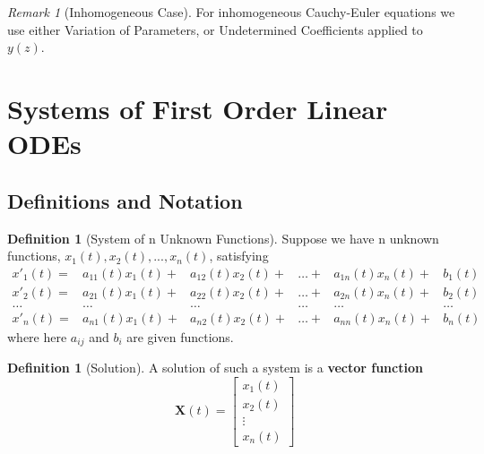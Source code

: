 \documentclass[12pt]{article}
\theoremstyle{definition}
\newtheorem{defn}[thm]{Definition}
\theoremstyle{remark}
\newtheorem{rmk}[thm]{Remark}
\numberwithin{equation}{section}
\newcommand\B[1]{\textbf{ #1}}
\begin{document}
\vspace{1cm}

\begin{rmk}[Inhomogeneous Case]
        For inhomogeneous Cauchy-Euler equations we use either Variation of Parameters, or Undetermined Coefficients applied to $y(z)$.
\end{rmk}



\clearpage

\section{Systems of First Order Linear ODEs}


\subsection{Definitions and Notation}

\begin{defn}[System of n Unknown Functions]
        Suppose we have n unknown functions, $x_1(t),x_2(t),...,x_n(t)$, satisfying \begin{equation}
                \begin{matrix}
                        x'_1(t)=&a_{11}(t)x_1(t)+&a_{12}(t)x_2(t)+&\hdots+&a_{1n}(t)x_n(t)+&b_1(t) \\
                        x'_2(t)=&a_{21}(t)x_1(t)+&a_{22}(t)x_2(t)+&\hdots+&a_{2n}(t)x_n(t)+&b_2(t) \\
                        \hdots&\hdots&\hdots&\hdots&\hdots&\hdots \\
                        x'_n(t)=&a_{n1}(t)x_1(t)+&a_{n2}(t)x_2(t)+&\hdots+&a_{nn}(t)x_n(t)+&b_n(t) 
                \end{matrix}
        \end{equation}
        where here $a_{ij}$ and $b_{i}$ are given functions.
\end{defn}

\vspace{1cm}

\begin{defn}[Solution]
        A solution of such a system is a \B{vector function} \begin{equation}
                \B{X}(t) = \begin{bmatrix}x_1(t) \\ x_2(t) \\ \vdots \\ x_n(t) \end{bmatrix}
        \end{equation}
\end{defn}
\end{document}
